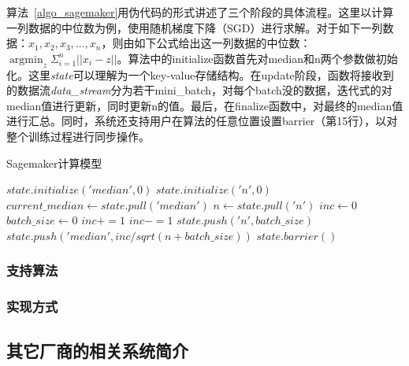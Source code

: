 算法~\ref{algo_sagemaker}用伪代码的形式讲述了三个阶段的具体流程。这里以计算一列数据的中位数为例，使用随机梯度下降（SGD）进行求解。对于如下一列数据：$x_1, x_2, x_3, ..., x_n$，则由如下公式给出这一列数据的中位数：$\operatorname{argmin}_z\Sigma_{i=1}^n||x_i-z||$。算法中的initialize函数首先对median和n两个参数做初始化。这里\textit{state}可以理解为一个key-value存储结构。在update阶段，函数将接收到的数据流\textit{data\_stream}分为若干mini\_batch，对每个batch没的数据，迭代式的对median值进行更新，同时更新n的值。最后，在finalize函数中，对最终的median值进行汇总。同时，系统还支持用户在算法的任意位置设置barrier（第15行），以对整个训练过程进行同步操作。

\begin{algorithm}
    \caption{Sagemaker计算模型}
    \label{algo_sagemaker}
    \begin{algorithmic}[1] 
        \State $state.initialize('median', 0)$
        \State $state.initialize('n', 0)$
        \EndFunction
        \State
        \State $current\_median \gets state.pull('median')$
        \State $n \gets state.pull('n')$
        \State $inc \gets 0$
        \State $batch\_size \gets 0$
        \State $inc += 1$
        \Else
        \State $inc -= 1$
        \EndIf
        \EndFor
        \State $state.push('n', batch\_size)$
        \State $state.push('median', inc / sqrt(n + batch\_size))$
        \State $state.barrier()$
        \EndIf
        \EndFor
        \EndFunction
        \State
        \State {}
        \EndFunction
    \end{algorithmic}
\end{algorithm}

\subsubsection{支持算法}
\subsubsection{实现方式}

\subsection{其它厂商的相关系统简介}

